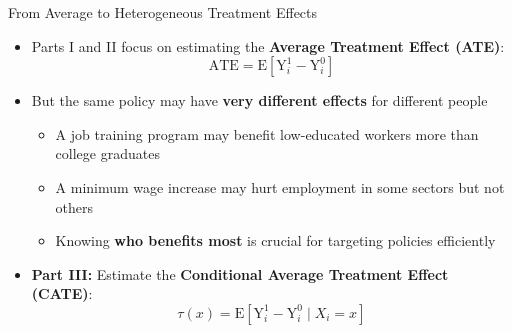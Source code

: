 \documentclass[dvipsnames,hyperref={pdfpagelabels=false}]{beamer}
\begin{document}
\begin{frame}{From Average to Heterogeneous Treatment Effects}
	\begin{itemize}
		\item Parts I and II focus on estimating the \textbf{Average Treatment Effect (ATE)}:
		\begin{equation*}
			\text{ATE} = \mathrm{E}[\mathrm{Y}^{1}_{i} - \mathrm{Y}^{0}_{i}]
		\end{equation*}

		\vspace{0.2cm}
		\item But the same policy may have \textbf{very different effects} for different people
		\vspace{0.2cm}
		\begin{itemize}
			\item A job training program may benefit low-educated workers more than college graduates
			\vspace{0.2cm}
			\item A minimum wage increase may hurt employment in some sectors but not others
			\vspace{0.2cm}
			\item Knowing \textbf{who benefits most} is crucial for targeting policies efficiently
		\end{itemize}
		\vspace{0.3cm}
		\item \textbf{Part III:} Estimate the \textbf{Conditional Average Treatment Effect (CATE)}:
		\begin{equation*}
			\tau(x) = \mathrm{E}[\mathrm{Y}^{1}_{i} - \mathrm{Y}^{0}_{i} \mid X_{i} = x]
		\end{equation*}
	\end{itemize}
\end{frame}






\end{document}
